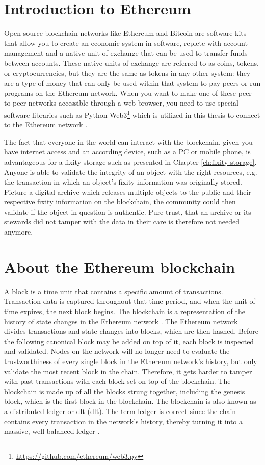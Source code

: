 \section{Introduction to Ethereum}
\label{sec:eth-blockchain}
Open source blockchain networks like Ethereum and Bitcoin are software kits that allow you to create an economic system in software, replete with account management and a native unit of exchange that can be used to transfer funds between accounts. These native units of exchange are referred to as coins, tokens, or cryptocurrencies, but they are the same as tokens in any other system: they are a type of money that can only be used within that system to pay peers or run programs on the Ethereum network.
When you want to make one of these peer-to-peer networks accessible through a web browser, you need to use special software libraries such as Python Web3\footnote{\url{https://github.com/ethereum/web3.py}} which is utilized in this thesis to connect to the Ethereum network \cite[2]{dannen2017introducing}.

The fact that everyone in the world can interact with the blockchain, given you have internet access and an according device, such as a PC or mobile phone, is advantageous for a fixity storage such as presented in Chapter \ref{ch:fixity-storage}. Anyone is able to validate the integrity of an object with the right resources, e.g. the transaction in which an object's fixity information was originally stored. Picture a digital archive which releases multiple objects to the public and their respective fixity information on the blockchain, the community could then validate if the object in question is authentic. Pure trust, that an archive or its stewards did not tamper with the data in their care is therefore not needed anymore.
\section{About the Ethereum blockchain}
A block is a time unit that contains a specific amount of transactions. Transaction data is captured throughout that time period, and when the unit of time expires, the next block begins. The blockchain is a representation of the history of state changes in the Ethereum network \cite[43]{dannen2017introducing}.
The Ethereum network divides transactions and state changes into blocks, which are then hashed. Before the following canonical block may be added on top of it, each block is inspected and validated. Nodes on the network will no longer need to evaluate the trustworthiness of every single block in the Ethereum network's history, but only validate the most recent block in the chain. Therefore, it gets harder to tamper with past transactions with each block set on top of the blockchain. The blockchain is made up of all the blocks strung together, including the genesis block, which is the first block in the blockchain. The blockchain is also known as a distributed ledger or \acrlong{dlt} (\acrshort{dlt}). The term ledger is correct since the chain contains every transaction in the network's history, thereby turning it into a massive, well-balanced ledger \cite[55]{dannen2017introducing}. 
